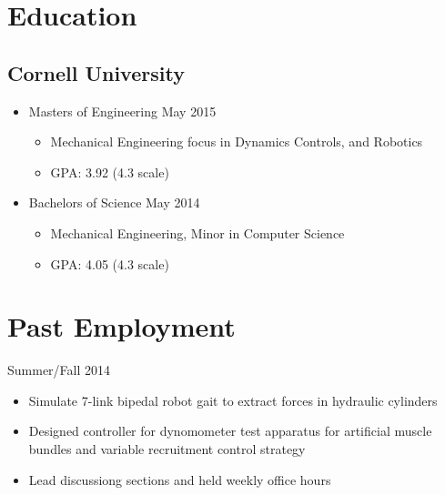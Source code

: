 \documentclass{BradyResume}
\begin{document}
\maketitle
\vspace*{-1em}
\section*{Education}
\subsection*{Cornell University}
\begin{itemize}
\item Masters of Engineering 
\dotfill May 2015
  \begin{itemize}
      \item Mechanical Engineering focus in Dynamics Controls, and Robotics
      \item GPA: 3.92 (4.3 scale)
  \end{itemize}
\item Bachelors of Science 
\dotfill May 2014
  \begin{itemize}
  \item Mechanical Engineering, Minor in Computer Science
  \item GPA: 4.05 (4.3 scale)
  \end{itemize}
\end{itemize}

\section*{Past Employment}
%
           {Summer/Fall 2014}
\begin{itemize}
  \item Simulate 7-link bipedal robot gait to extract forces in hydraulic cylinders
  \item Designed controller for dynomometer test apparatus for artificial muscle bundles and variable recruitment control strategy
\end{itemize}

\begin{itemize}
  \item Lead discussiong sections and held weekly office hours
\end{itemize}
\end{document}
